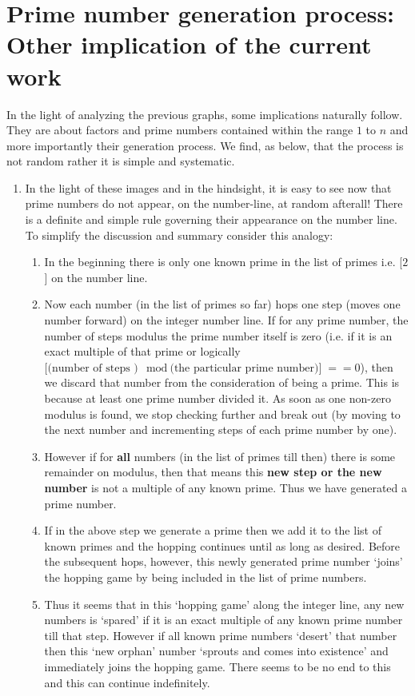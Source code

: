 \documentclass[10pt, twoside]{article}
\begin{document}
\section{Prime number generation process: Other implication of the current work}
In the light of analyzing the previous graphs, some implications naturally follow. They are about factors and prime numbers contained within the range $1$ to $n$ and more importantly their generation process. We find, as below, that the process is not random rather it is simple and systematic. 	 
\begin{enumerate}
	\item In the light of these images and in the hindsight, it is easy to see now that prime numbers do not appear, on the number-line, at random afterall! There is a definite and simple rule governing their appearance on the number line. To simplify the discussion and summary consider this analogy: 
	\begin{enumerate}
	\item In the beginning there is only one known prime in the list of primes i.e. [$2$] on the number line. 
	\item Now each number (in the list of primes so far) hops one step (moves one number forward) on the integer number line. If for any prime number, the number of steps modulus the prime number itself is zero (i.e. if it is an exact multiple of that prime or logically $\text{[(number of steps )} \mod \text{(the particular prime number)]} == 0$), then we discard that number from the consideration of being a prime. This is because at least one prime number divided it. As soon as one non-zero modulus is found, we stop checking further and break out (by moving to the next number and incrementing steps of each prime number by one). 
	\item However if for \textbf{all} numbers (in the list of primes till then) there is some remainder on modulus, then that means this \textbf{new step or the new number} is not a multiple of any known prime. Thus we have generated a prime number.
	\item If in the above step we generate a prime then we add it to the list of known primes and the hopping continues until as long as desired. Before the subsequent hops, however, this newly generated prime number `joins' the hopping game by being included in the list of prime numbers.
	\item Thus it seems that in this `hopping game' along the integer line, any new numbers is `spared' if it is an exact multiple of any known prime number till that step. However if all known prime numbers `desert' that number then this `new orphan' number `sprouts and comes into existence' and immediately joins the hopping game. There seems to be no end to this and this can continue indefinitely.

\end{enumerate}
\end{enumerate}
\end{document}
